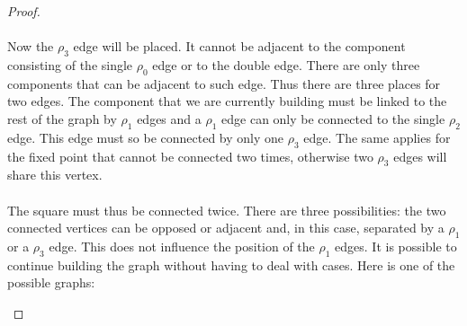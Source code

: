 \begin{proof}
\paragraph{}
Now the $\rho_3$ edge will be placed. It cannot be adjacent to the component consisting of the single $\rho_0$ edge or to the double edge. There are only three components that can be adjacent to such edge. Thus there are three places for two edges. The component that we are currently building must be linked to the rest of the graph by $\rho_1$ edges and a $\rho_1$ edge can only be connected to the single $\rho_2$ edge. This edge must so be connected by only one $\rho_3$ edge. The same applies for the fixed point that cannot be connected two times, otherwise two $\rho_3$ edges will share this vertex.

\paragraph{}
The square must thus be connected twice. There are three possibilities: the two connected vertices can be opposed or adjacent and, in this case, separated by a $\rho_1$ or a $\rho_3$ edge. This does not influence the position of the $\rho_1$ edges. It is possible to continue building the graph without having to deal with cases. Here is one of the possible graphs:

\begin{figure}[H]
  \begin{center}
\end{center}
\end{figure}
\end{proof}
